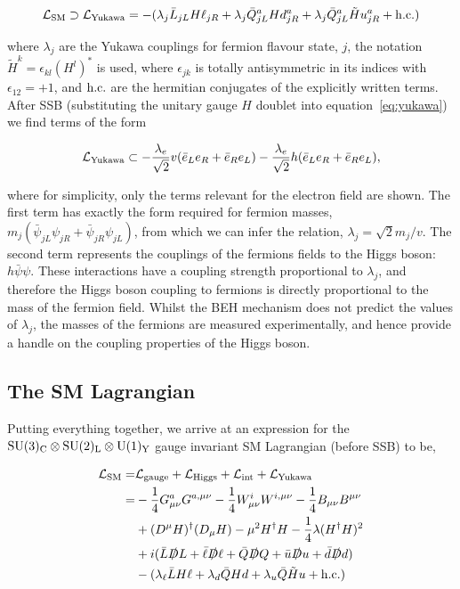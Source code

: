 \begin{equation}\label{eq:yukawa}
    \mathcal{L}_{\rm{SM}} \supset \mathcal{L}_{\rm{Yukawa}} = -(\lambda_j \bar{L}_{jL} H \ell_{jR} + \lambda_j \bar{Q}^a_{jL} H d^a_{jR} + \lambda_j \bar{Q}^a_{jL} \tilde{H} u^a_{jR} + {\rm{h.c.}})
\end{equation}

\noindent
where $\lambda_j$ are the Yukawa couplings for fermion flavour state, $j$, the notation $\tilde{H}^k=\epsilon_{kl}(H^l)^*$ is used, where $\epsilon_{jk}$ is totally antisymmetric in its indices with $\epsilon_{12}=+1$, and ${\rm{h.c.}}$ are the hermitian conjugates of the explicitly written terms. After SSB (substituting the unitary gauge $H$ doublet into equation~\ref{eq:yukawa}) we find terms of the form

\begin{equation}
   \mathcal{L}_{\rm{Yukawa}} \subset -\frac{\lambda_e}{\sqrt{2}}v(\bar{e}_Le_R+\bar{e}_Re_L)-\frac{\lambda_e}{\sqrt{2}}h(\bar{e}_Le_R+\bar{e}_Re_L),
\end{equation}

\noindent
where for simplicity, only the terms relevant for the electron field are shown. The first term has exactly the form required for fermion masses, $m_{j}(\bar{\psi}_{jL}\psi_{jR}+\bar{\psi}_{jR}\psi_{jL})$, from which we can infer the relation, $\lambda_j = \sqrt{2}m_j/v$. The second term represents the couplings of the fermions fields to the Higgs boson: $h\bar{\psi}\psi$. These interactions have a coupling strength proportional to $\lambda_j$, and therefore the Higgs boson coupling to fermions is directly proportional to the mass of the fermion field. Whilst the BEH mechanism does not predict the values of $\lambda_j$, the masses of the fermions are measured experimentally, and hence provide a handle on the coupling properties of the Higgs boson.

\subsection{The SM Lagrangian}
Putting everything together, we arrive at an expression for the ${\rm{SU}}(3)_{\rm{C}} \otimes {\rm{SU}}(2)_{\rm{L}} \otimes {\rm{U}}(1)_{\rm{Y}}$ gauge invariant SM Lagrangian (before SSB) to be,

\begin{equation}
\begin{split}
    \mathcal{L}_{\rm{SM}} = & \mathcal{L}_{\rm{gauge}} + \mathcal{L}_{\rm{Higgs}} + \mathcal{L}_{\rm{int}} + \mathcal{L}_{\rm{Yukawa}}
    \\
    = &-\frac{1}{4}G^a_{\mu\nu}G^{a,\mu\nu} -\frac{1}{4}W^i_{\mu\nu}W^{i,\mu\nu} -\frac{1}{4}B_{\mu\nu}B^{\mu\nu} 
    \\
    &+ (D^\mu H)^{\dagger}(D_\mu H) - \mu^2H^{\dagger}H - \frac{1}{4}\lambda(H^{\dagger}H)^2
    \\
    &+ i(\bar{L}\slashed{D}L+\bar{\ell}\slashed{D}\ell+\bar{Q}\slashed{D}Q+\bar{u}\slashed{D}u+\bar{d}\slashed{D}d)
    \\
    &- (\lambda_\ell \bar{L} H \ell + \lambda_d \bar{Q} H d + \lambda_u \bar{Q} \tilde{H} u + {\rm{h.c.}})
\end{split}
\end{equation}

